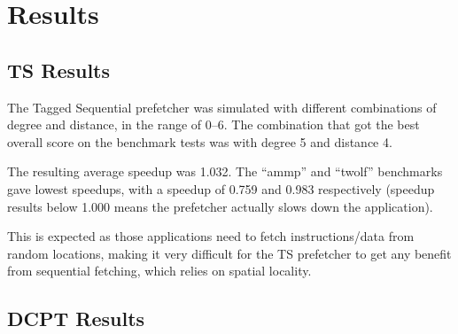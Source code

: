 \section{Results}

\subsection{TS Results}

The Tagged Sequential prefetcher was simulated with different combinations of
degree and distance, in the range of 0--6. The combination that got the best
overall score on the benchmark tests was with degree 5 and distance 4.

The resulting average speedup was 1.032. The ``ammp'' and ``twolf'' benchmarks
gave lowest speedups, with a speedup of 0.759 and 0.983 respectively (speedup
results below 1.000 means the prefetcher actually slows down the application).

This is expected as those applications need to fetch instructions/data from
random locations, making it very difficult for the TS prefetcher
to get any benefit from sequential fetching, which relies on spatial locality.

\subsection{DCPT Results}


